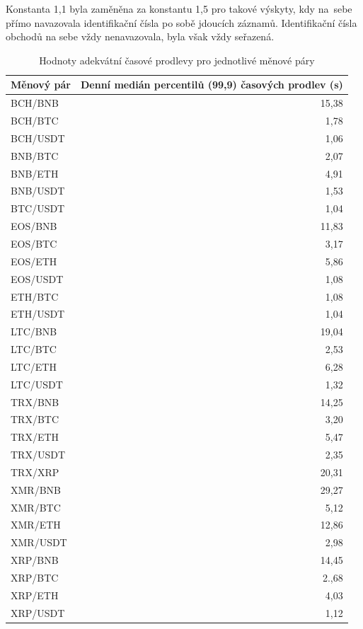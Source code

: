 \documentclass[thesis=B,czech]{FITthesis}[2019/03/21]
\begin{document}
Konstanta 1,1 byla zaměněna za konstantu 1,5 pro takové výskyty, kdy na~sebe přímo navazovala identifikační čísla po sobě jdoucích záznamů. Identifikační čísla obchodů na sebe vždy nenavazovala, byla však vždy seřazená. 

\begin{table}\centering
\caption{Hodnoty adekvátní časové prodlevy pro jednotlivé měnové páry}
\label{tolerances}
\begin{tabular}{|| l | r ||}\hline Měnový pár & Denní medián percentilů (99,9) časových prodlev (s)\\ [0.5ex]
 \hline
  \hline BCH/BNB & 15,38 \\
  \hline BCH/BTC & 1,78 \\
  \hline BCH/USDT & 1,06 \\
  \hline BNB/BTC & 2,07 \\
  \hline BNB/ETH & 4,91 \\
  \hline BNB/USDT & 1,53 \\
  \hline BTC/USDT & 1,04 \\
  \hline EOS/BNB & 11,83 \\
  \hline EOS/BTC & 3,17 \\
  \hline EOS/ETH & 5,86 \\
  \hline EOS/USDT & 1,08 \\
  \hline ETH/BTC & 1,08 \\
  \hline ETH/USDT & 1,04 \\
  \hline LTC/BNB & 19,04 \\
  \hline LTC/BTC & 2,53 \\
  \hline LTC/ETH & 6,28 \\
  \hline LTC/USDT & 1,32 \\
  \hline TRX/BNB & 14,25 \\
  \hline TRX/BTC & 3,20 \\
  \hline TRX/ETH & 5,47 \\
  \hline TRX/USDT & 2,35 \\
  \hline TRX/XRP & 20,31 \\
  \hline XMR/BNB & 29,27 \\
  \hline XMR/BTC & 5,12 \\
  \hline XMR/ETH & 12,86 \\
  \hline XMR/USDT & 2,98 \\
  \hline XRP/BNB & 14,45 \\
  \hline XRP/BTC & 2.,68 \\
  \hline XRP/ETH & 4,03 \\
  \hline XRP/USDT & 1,12 \\
  \hline
\end{tabular}
\end{table}
\end{document}
